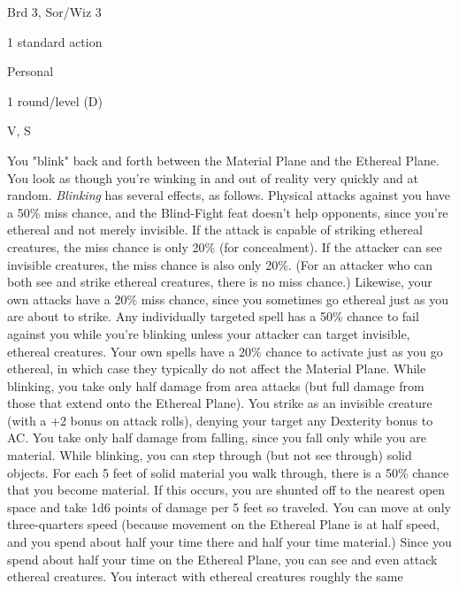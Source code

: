 
\begin{description*}
\item[Level:] Brd 3, Sor/Wiz 3
\item[Casting Time:] 1 standard action
\item[Range:] Personal
\item[Duration:] 1 round/level (D)
\item[Components:] V, S
\end{description*}

You "blink" back and forth between the Material Plane and the Ethereal Plane.
You look as though you're winking in and out of reality very quickly and at random.
\textit{Blinking} has several effects, as follows.
Physical attacks against you have a 50\% miss chance, and the Blind-Fight feat
doesn't help opponents, since you're ethereal and not merely invisible. If the
attack is capable of striking ethereal creatures, the miss chance is only 20\%
(for concealment).
If the attacker can see invisible creatures, the miss chance is also only 20\%.
(For an attacker who can both see and strike ethereal creatures, there is no miss
chance.) Likewise, your own attacks have a 20\% miss chance, since you sometimes
go ethereal just as you are about to strike.
Any individually targeted spell has a 50\% chance to fail against you while you're
blinking unless your attacker can target invisible, ethereal creatures.
Your own spells have a 20\% chance to activate just as you go ethereal, in which
case they typically do not affect the Material Plane.
While blinking, you take only half damage from area attacks (but full
damage from those that extend onto the Ethereal Plane). You strike as an invisible
creature (with a +2 bonus on attack rolls), denying your target any Dexterity bonus
to AC.
You take only half damage from falling, since you fall only while you are material.
While blinking, you can step through (but not see through) solid objects.
For each 5 feet of solid material you walk through, there is a 50\% chance that
you become material. If this occurs, you are shunted off to the nearest open space
and take 1d6 points of damage per 5 feet so traveled. You can move at only three-quarters
speed (because movement on the Ethereal Plane is at half speed, and you spend about
half your time there and half your time material.)
Since you spend about half your time on the Ethereal Plane, you can see and even
attack ethereal creatures. You interact with ethereal creatures roughly the same
